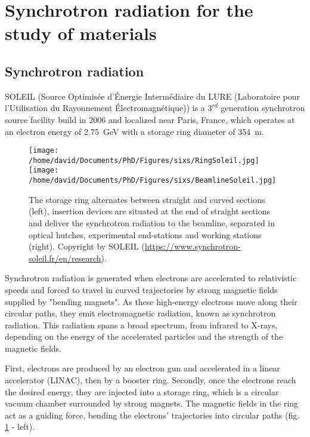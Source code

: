 \section{Synchrotron radiation for the study of materials} \label{sec:SIXS}

\subsection{Synchrotron radiation}

SOLEIL (Source Optimisée d’Énergie Intermédiaire du LURE (Laboratoire pour l’Utilisation du Rayonnement Électromagnétique)) is a $3^{rd}$ generation synchrotron source facility build in 2006 and localized near Paris, France, which operates at an electron energy of \qty{2.75}{\GeV} with a storage ring diameter of \qty{354}{\m}.

\begin{figure}[!htb]
    \centering
    \texttt{[image: /home/david/Documents/PhD/Figures/sixs/RingSoleil.jpg]}
    \texttt{[image: /home/david/Documents/PhD/Figures/sixs/BeamlineSoleil.jpg]}
    \caption{
    	The storage ring alternates between straight and curved sections (left), insertion devices are situated at the end of straight sections and deliver the synchrotron radiation to the beamline, separated in optical hutches, experimental end-stations and working stations (right).
    	Copyright by SOLEIL (\url{https://www.synchrotron-soleil.fr/en/research}).
    }
    \label{fig:SOLEIL}
\end{figure}

Synchrotron radiation is generated when electrons are accelerated to relativistic speeds and forced to travel in curved trajectories by strong magnetic fields supplied by "bending magnets".
As these high-energy electrons move along their circular paths, they emit electromagnetic radiation, known as synchrotron radiation.
This radiation spans a broad spectrum, from infrared to X-rays, depending on the energy of the accelerated particles and the strength of the magnetic fields.

First, electrons are produced by an electron gun and accelerated in a linear accelerator (LINAC), then by a booster ring.
Secondly, once the electrons reach the desired energy, they are injected into a storage ring, which is a circular vacuum chamber surrounded by strong magnets.
The magnetic fields in the ring act as a guiding force, bending the electrons' trajectories into circular paths (fig. \ref{fig:SOLEIL} - left).

